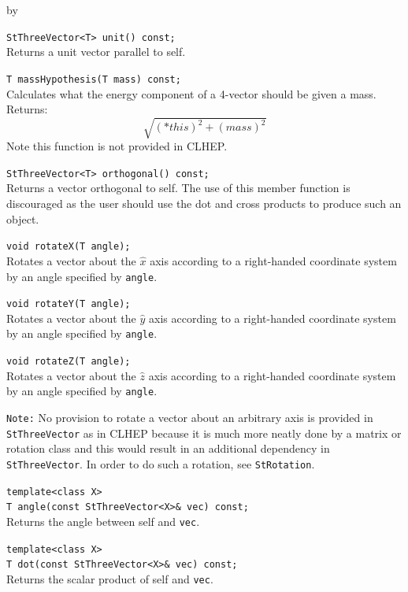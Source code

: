 \documentclass[twoside]{article}
\newcommand{\comp}[1]{\texttt{#1}}%
\newcommand{\entrylabel}[1]{\mbox{\textbf{{#1}}}\hfil}%
\newenvironment{entry}
{\begin{list}{}%
    {\renewcommand{\makelabel}{\entrylabel}%
     \setlength{\labelwidth}{90pt}%
     \setlength{\leftmargin}{\labelwidth}
     \advance\leftmargin by \labelsep%
      }%
    }%
  {\end{list}}
\newcommand{\Entrylabel}[1]%
{\raisebox{0pt}[1ex][0pt]{\makebox[\labelwidth][l]%
    {\parbox[t]{\labelwidth}{\hspace{0pt}\textbf{{#1}}}}}}
\newenvironment{Entry}%
{\renewcommand{\entrylabel}{\Entrylabel}\begin{entry}}%
  {\end{entry}}
\begin{document}
\begin{Entry}
    \verb+StThreeVector<T> unit() const;+\\
    Returns a unit vector parallel to self.

    \verb+T massHypothesis(T mass) const;+\\
    Calculates what the energy component of a 4-vector
    should be given a mass.  Returns:
    \begin{equation*}
      \sqrt{(*this)^{2} + (mass)^{2}}
    \end{equation*}
    Note this function is not provided in CLHEP.
    
    \verb+StThreeVector<T> orthogonal() const;+\\
    Returns a vector orthogonal to self.  The use of this
    member function is discouraged as the user should
    use the dot and cross products to produce such an
    object.

    \verb+void rotateX(T angle);+\\
    Rotates a vector about the $\hat{x}$ axis according to a right-handed
    coordinate system by an angle specified by \texttt{angle}.

    \verb+void rotateY(T angle);+\\
    Rotates a vector about the $\hat{y}$ axis according to a right-handed
    coordinate system by an angle specified by \texttt{angle}.

    \verb+void rotateZ(T angle);+\\
    Rotates a vector about the $\hat{z}$ axis according to a right-handed
    coordinate system by an angle specified by \texttt{angle}.

    \comp{Note:} No provision to rotate a vector about an arbitrary axis
    is provided in \comp{StThreeVector} as in CLHEP because it is much
    more neatly done by a matrix or rotation class and this would result
    in an additional dependency in \comp{StThreeVector}.  In order
    to do such a rotation, see \comp{StRotation}.\label{StRotation}
    
    \verb+template<class X>+\\
    \verb+T angle(const StThreeVector<X>& vec) const;+\\
    Returns the angle between self and \comp{vec}.
    
    \verb+template<class X>+\\
    \verb+T dot(const StThreeVector<X>& vec) const;+\\
    Returns the scalar product of self and \comp{vec}.
    

\end{Entry}
\end{document}
